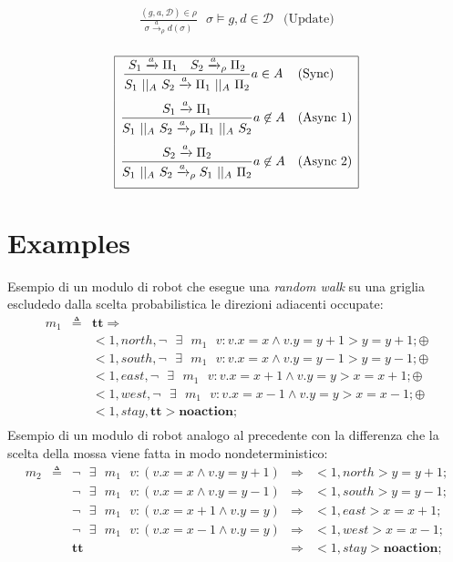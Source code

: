 \documentclass{article}
\newcommand{\Space}{\mbox{ }}
\newcommand{\Par}{\Space||_A\Space}
\begin{document}
$$
\begin{array}{cl}
	\displaystyle{\frac{(g,a,\mathcal{D}) \in \rho}{\sigma \xrightarrow{a}_\rho d(\sigma)} \Space \sigma \models g, d \in \mathcal{D} } & \mbox{(Update)} \\
\end{array}
$$

$$
\begin{array}{|cl|}
	\hline
	\displaystyle{\frac{S_1 \xrightarrow{a} \Pi_1 \quad S_2 \xrightarrow{a}_\rho \Pi_2}{S_1 \Par S_2 \xrightarrow{a} \Pi_1 \Par \Pi_2}a \in A} & \mbox{(Sync)} \\[.5cm]
	\displaystyle{\frac{S_1 \xrightarrow{a} \Pi_1}{S_1 \Par S_2 \xrightarrow{a}_\rho \Pi_1 \Par S_2}a \not\in A} & \mbox{(Async\ 1)} \\[.5cm]
	\displaystyle{\frac{S_2 \xrightarrow{a} \Pi_2}{S_1 \Par S_2 \xrightarrow{a}_\rho S_1 \Par \Pi_2}a \not\in A} & \mbox{(Async\ 2)} \\[.5cm]
	\hline
\end{array}
$$


\section{Examples}
Esempio di un modulo di robot che esegue una \emph{random walk} su una griglia escludedo dalla scelta probabilistica le direzioni adiacenti occupate:
$$
\begin{array}{rcl}
m_1 & \triangleq & \mathbf{tt} \Rightarrow \\ 
	& & <1, north, \neg \Space \exists \Space m_1 \Space v: v.x=x \wedge v.y=y+1> y=y+1; \oplus \\
	& & <1, south, \neg \Space \exists \Space m_1 \Space v: v.x=x \wedge v.y=y-1> y=y-1; \oplus \\ 
	& & <1, east, \neg \Space \exists \Space m_1 \Space v: v.x=x+1 \wedge v.y=y> x=x+1; \oplus \\ 
	& & <1, west, \neg \Space \exists \Space m_1 \Space v: v.x=x-1 \wedge v.y=y> x=x-1; \oplus \\ 
	& & <1, stay, \mathbf{tt}> \mathbf{noaction};\\ 
\end{array}
$$
Esempio di un modulo di robot analogo al precedente con la differenza che la scelta della mossa viene fatta in modo nondeterministico:
$$
\begin{array}{rclcl}
m_2 & \triangleq & \neg \Space \exists \Space m_1 \Space v: (v.x=x \wedge v.y=y+1) &\Rightarrow& <1,north> y=y+1; \\ 
	& & \neg \Space \exists \Space m_1 \Space v: (v.x=x \wedge v.y=y-1) &\Rightarrow& <1,south> y=y-1; \\ 
	& & \neg \Space \exists \Space m_1 \Space v: (v.x=x+1 \wedge v.y=y) &\Rightarrow& <1,east> x=x+1; \\ 
	& & \neg \Space \exists \Space m_1 \Space v: (v.x=x-1 \wedge v.y=y) &\Rightarrow& <1,west> x=x-1; \\ 
	& & \mathbf{tt} &\Rightarrow& <1,stay> \mathbf{noaction}; \\ 
\end{array}
$$
\end{document}
